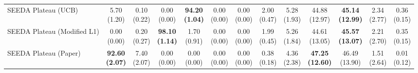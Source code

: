 \begin{table}[H]
{\begin{tabular}{l|cccccc|cccccc}
SEEDA Plateau (UCB) & \makecell{5.70 \\ (1.20)} & \makecell{0.10 \\ (0.22)} & {\cellcolor[HTML]{C8E6C9}} \makecell{0.00 \\ (0.00)} & \bfseries \makecell{94.20 \\ (1.04)} & \makecell{0.00 \\ (0.00)} & \makecell{0.00 \\ (0.00)} & \makecell{2.00 \\ (0.47)} & \makecell{5.28 \\ (1.93)} & {\cellcolor[HTML]{C8E6C9}} \makecell{44.88 \\ (12.97)} & \bfseries \makecell{45.14 \\ (12.99)} & \makecell{2.34 \\ (2.77)} & \makecell{0.36 \\ (0.15)} \\
SEEDA Plateau (Modified L1) & \makecell{0.00 \\ (0.00)} & \makecell{0.20 \\ (0.27)} & {\cellcolor[HTML]{C8E6C9}} \bfseries \makecell{98.10 \\ (1.14)} & \makecell{1.70 \\ (0.91)} & \makecell{0.00 \\ (0.00)} & \makecell{0.00 \\ (0.00)} & \makecell{1.99 \\ (0.45)} & \makecell{5.26 \\ (1.84)} & {\cellcolor[HTML]{C8E6C9}} \makecell{44.61 \\ (13.05)} & \bfseries \makecell{45.57 \\ (13.07)} & \makecell{2.21 \\ (2.70)} & \makecell{0.35 \\ (0.15)} \\
SEEDA Plateau (Paper) & \bfseries \makecell{92.60 \\ (2.07)} & \makecell{7.40 \\ (2.07)} & {\cellcolor[HTML]{C8E6C9}} \makecell{0.00 \\ (0.00)} & \makecell{0.00 \\ (0.00)} & \makecell{0.00 \\ (0.00)} & \makecell{0.00 \\ (0.00)} & \makecell{0.38 \\ (0.18)} & \makecell{4.36 \\ (2.38)} & {\cellcolor[HTML]{C8E6C9}} \bfseries \makecell{47.25 \\ (12.60)} & \makecell{46.49 \\ (13.90)} & \makecell{1.51 \\ (2.64)} & \makecell{0.01 \\ (0.12)} \\
\bottomrule
\end{tabular}
}%
\end{table}
